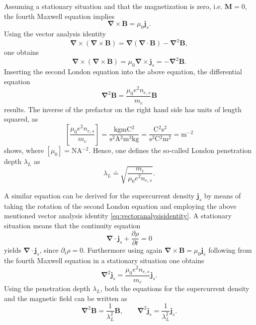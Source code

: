\documentclass{report}
\numberwithin{tm}{section}
\newcommand\vect[1]{\ensuremath{\bm{#1}}}
\begin{document}
Assuming a stationary situation and that the magnetization is zero, i.e. $\vect{M} = 0$, the fourth Maxwell equation implies \begin{equation}
	\vect{\nabla} \times \vect{B} = \mu_0 \vect{j}_s.
\end{equation} Using the vector analysis identity \begin{equation}\label{eq:vectoranalysisidentity}
\vect{\nabla} \times (\vect{\nabla} \times \vect{B}) = \vect{\nabla}(\vect{\nabla} \cdot \vect{B}) - \vect{\nabla}^2\vect{B},
\end{equation} one obtains
\begin{equation}
	\vect{\nabla} \times (\vect{\nabla} \times \vect{B}) = \mu_0\vect{\nabla}\times  \vect{j}_s =  - \vect{\nabla}^2\vect{B}.
\end{equation} Inserting the second London equation into the above equation, the differential equation \begin{equation}
\vect{\nabla}^2\vect{B} = \frac{\mu_0e^2n_{e,s}}{m_e}\vect{B}
\end{equation} results. The inverse of the prefactor on the right hand side has units of length squared, as \begin{equation}
\left[\frac{\mu_0e^2n_{e,s}}{m_e}\right] = \frac{\si{\kilogram\meter\coulomb^2}}{\si{\second^2\ampere^2\meter^3\kilogram}} = \frac{\si{\coulomb^2\second^2}}{\si{\second^2\coulomb^2\meter^2}} = \si{\meter^{-2}}
\end{equation} shows, where $[\mu_0] = \si{\newton\ampere^{-2}}$. Hence, one defines the so-called London penetration depth $\lambda_L$ as
\begin{equation}
	\lambda_L \doteq \sqrt{\frac{m_e}{\mu_0e^2n_{e,s}}}.
\end{equation}

A similar equation can be derived for the supercurrent density $\vect{j}_s$ by means of taking the rotation of the second London equation and employing the above mentioned vector analysis identity \cref{eq:vectoranalysisidentity}. A stationary situation means that the continuity equation \begin{equation}
	\vect{\nabla}\cdot \vect{j}_s + \frac{\partial \rho}{\partial t} = 0
\end{equation} yields $\vect{\nabla}\cdot \vect{j}_s$, since $\partial_t \rho = 0$. Furthermore using again $\vect{\nabla}\times \vect{B} = \mu_0\vect{j}_s$ following from the fourth Maxwell equation in a stationary situation one obtains \begin{equation}
\vect{\nabla}^2\vect{j}_s = \frac{\mu_0 e^2n_{e,s}}{m_e}\vect{j}_s.
\end{equation} Using the penetration depth $\lambda_L$, both the equations for the supercurrent density and the magnetic field can be written as \begin{equation}
\vect{\nabla}^2 \vect{B} = \frac{1}{\lambda_L^2}\vect{B}, \qquad \vect{\nabla}^2 \vect{j}_s = \frac{1}{\lambda_L^2}\vect{j}_s.
\end{equation}
\end{document}
